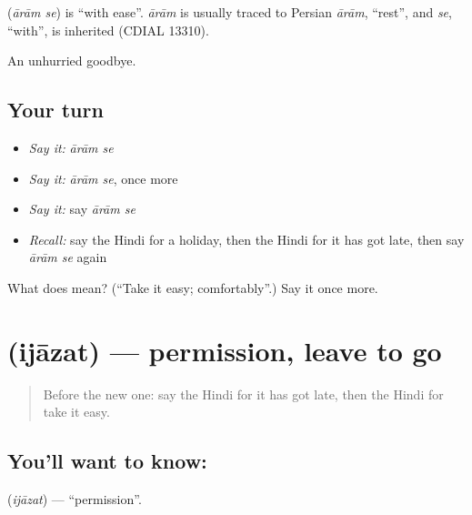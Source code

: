 \begin{cousinweb}
\textbf{ } (\emph{ārām se}) is \textquotedblleft{}with ease\textquotedblright{}. \emph{ārām} is usually traced to Persian \emph{ārām}, \textquotedblleft{}rest\textquotedblright{}, and \emph{se}, \textquotedblleft{}with\textquotedblright{}, is inherited (CDIAL 13310).
\end{cousinweb}

\begin{grammarlens}[title={What you've built}]
An unhurried goodbye.
\end{grammarlens}

\subsection*{Your turn}
\begin{itemize}
\raggedright
  \item \emph{Say it:} \emph{ārām se}
  \item \emph{Say it:} \emph{ārām se}, once more
  \item \emph{Say it:} say \emph{ārām se}
  \item \emph{Recall:} say the Hindi for a holiday, then the Hindi for it has got late, then say \emph{ārām se} again
\end{itemize}

\begin{tcolorbox}[breakable,colback=teal!4,colframe=teal!35!black,title={Before you move on}]
What does   mean? (\textquotedblleft{}Take it easy; comfortably\textquotedblright{}.) Say it once more.
\end{tcolorbox}
\section[\texorpdfstring{\hi{इजाज़त} (ijāzat)}{इजाज़त (ijāzat)}]{ (ijāzat) — permission, leave to go}

\label{lesson:HI-C122-ijazat}



\begin{quote}
Before the new one: say the Hindi for it has got late, then the Hindi for take it easy.
\end{quote}

\subsection*{You'll want to know: }
\textbf{} (\emph{ijāzat}) — \textquotedblleft{}permission\textquotedblright{}.

